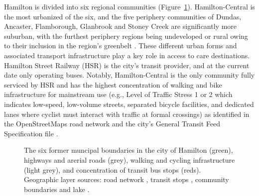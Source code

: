 \documentclass[
  authoryear,
  preprint,
  3p]{elsarticle}
\begin{document}
Hamilton is divided into six regional communities
(Figure~\ref{fig-Fig1}). Hamilton-Central is the most urbanized of the
six, and the five periphery communities of Dundas, Ancaster,
Flamborough, Glanbrook and Stoney Creek are significantly more suburban,
with the furthest periphery regions being undeveloped or rural owing to
their inclusion in the region's greenbelt
\citep{greenbeltfoundationThrivingGreenbeltThriving2023}. These
different urban forms and associated transport infrastructure play a key
role in access to care destinations. Hamilton Street Railway (HSR) is
the city's transit provider, and at the current date only operating
buses. Notably, Hamilton-Central is the only community fully serviced by
HSR and has the highest concentration of walking and bike infrastructure
for mainstream use (e.g., Level of Traffic Stress 1 or 2 which indicates
low-speed, low-volume streets, separated bicycle facilities, and
dedicated lanes where cyclist must interact with traffic at formal
crossings) \citep{conveyalCyclingLevelTraffic2024} as identified in the
OpenStreetMaps road network \citep{geofabrikOntarioCanadaOpen2023} and
the city's General Transit Feed Specification file
\citep{transitfeedsHamiltonStreetRailway2023}.

\begin{figure}


\caption{\label{fig-Fig1}The six former muncipal boundaries in the city
of Hamilton (green), highways and arerial roads (grey), walking and
cycling infrastructure (light grey), and concentration of transit bus
stops (reds). Geographic layer sources: road network
\citep{geofabrikOntarioCanadaOpen2023}, transit stops
\citep{transitfeedsHamiltonStreetRailway2023}, community boundaries
\citep{opendatahamiltonCityBoundary2023} and lake
\citep{greatlakesUSGS2010}.}

\end{figure}%
\end{document}
